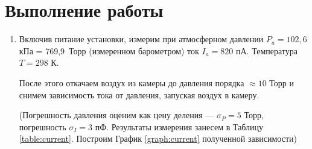 \documentclass[a4paper, 12pt]{article}
\begin{document}
	\newpage
	
	\section*{Выполнение работы}
	\begin{enumerate}
	
		
		\item Включив питание установки, измерим при атмосферном давлении $ P_a = 102,6 $ кПа = 769,9~Торр (измеренном барометром) ток $ I_a = 820 $ пА. Температура $ T = 298 $ К.
		\vspace{0.1cm}
		
		\begin{minipage}{0.45\textwidth}
		 После этого откачаем воздух из камеры до давления порядка $ \approx 10 $ Торр и снимем зависимость тока от давления, запуская воздух в камеру.
		
		(Погрешность давления оценим как цену деления --- $ \sigma_P = 5 $ Торр, погрешность $ \sigma_I = 3 $ пФ. Результаты измерения занесем в Таблицу \ref{table:current}. Построим График \ref{graph:current} полученной зависимости)
		
		\begin{center}
        \end{center}
		

\end{minipage}
\end{enumerate}
\end{document}
